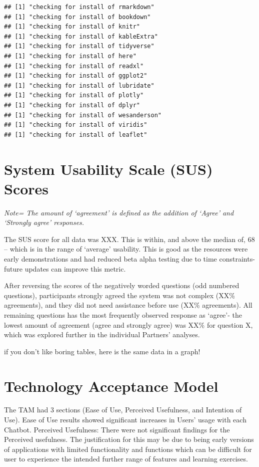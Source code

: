 \documentclass[a4paper, nobind]{templates/ociamthesis}
\begin{document}
\begin{verbatim}
## [1] "checking for install of rmarkdown"
## [1] "checking for install of bookdown"
## [1] "checking for install of knitr"
## [1] "checking for install of kableExtra"
## [1] "checking for install of tidyverse"
## [1] "checking for install of here"
## [1] "checking for install of readxl"
## [1] "checking for install of ggplot2"
## [1] "checking for install of lubridate"
## [1] "checking for install of plotly"
## [1] "checking for install of dplyr"
## [1] "checking for install of wesanderson"
## [1] "checking for install of viridis"
## [1] "checking for install of leaflet"
\end{verbatim}

\hypertarget{system-usability-scale-sus-scores}{%
\section{System Usability Scale (SUS) Scores}\label{system-usability-scale-sus-scores}}

\emph{Note= The amount of `agreement' is defined as the addition of `Agree' and `Strongly agree' responses.}

The SUS score for all data was XXX. This is within, and above the median of, 68 -- which is in the range of `average' usability. This is good as the resources were early demonstrations and had reduced beta alpha testing due to time constraints- future updates can improve this metric.

After reversing the scores of the negatively worded questions (odd numbered questions), participants strongly agreed the system was not complex (XX\% agreements), and they did not need assistance before use (XX\% agreements). All remaining questions has the most frequently observed response as `agree'- the lowest amount of agreement (agree and strongly agree) was XX\% for question X, which was explored further in the individual Partners' analyses.

if you don't like boring tables, here is the same data in a graph!

\hypertarget{technology-acceptance-model}{%
\section{Technology Acceptance Model}\label{technology-acceptance-model}}

The TAM had 3 sections (Ease of Use, Perceived Usefulness, and Intention of Use). Ease of Use results showed significant increases in Users' usage with each Chatbot. Perceived Usefulness: There were not significant findings for the Perceived usefulness. The justification for this may be due to being early versions of applications with limited functionality and functions which can be difficult for user to experience the intended further range of features and learning exercises.
\end{document}
